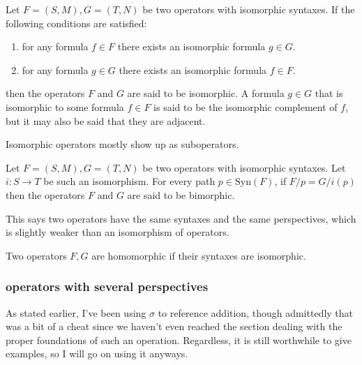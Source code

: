 \documentclass[twoside]{article}
\newenvironment{definition}[1][Definition]{\begin{trivlist}
\item[\hskip \labelsep {\bfseries #1}]}{\end{trivlist}}
\begin{document}
\begin{definition}[Operator Isomorphism]

Let $ F=(S, M), G=(T, N) $ be two operators with isomorphic syntaxes.  If the following conditions are satisfied:

\begin{enumerate}
\item for any formula $ f\in F $ there exists an isomorphic formula $ g\in G $.
\item for any formula $ g\in G $ there exists an isomorphic formula $ f\in F $.
\end{enumerate}

then the operators $ F $ and $ G $ are said to be isomorphic.  A formula $ g\in G $ that is isomorphic
to some formula $ f\in F $ is said to be the isomorphic complement of $ f $, but it may also be said that they are
adjacent.

\end{definition}
Isomorphic operators mostly show up as suboperators.

\begin{definition}[Bimorphism]

Let $ F=(S, M), G=(T, N) $ be two operators with isomorphic syntaxes.  Let $ i:S\to T $ be such an isomorphism.
For every path $ p\in\mbox{Syn}(F) $, if $ F/p=G/i(p) $ then the operators $ F $ and $ G $ are said to be bimorphic.

\end{definition}
This says two operators have the same syntaxes and the same perspectives, which is slightly weaker than an isomorphism
of operators.

\begin{definition}[Operator Homomorphism]

Two operators $ F, G $ are homomorphic if their syntaxes are isomorphic.

\end{definition}

\subsubsection{operators with several perspectives}

As stated earlier, I've been using $ \sigma $ to reference addition, though admittedly that was a bit of a cheat since
we haven't even reached the section dealing with the proper foundations of such an operation.  Regardless, it is still
worthwhile to give examples, so I will go on using it anyways.
\end{document}
